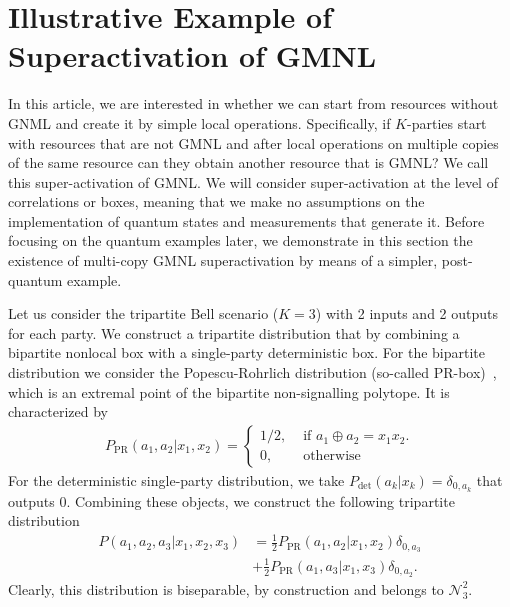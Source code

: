 \documentclass[pra,aps,reprint,superscriptaddress]{revtex4-2}
\theoremstyle{theorem}
\begin{document}
\section{Illustrative Example of Superactivation of GMNL}

In this article, we are interested in whether we can start from resources without GNML and create it by simple local operations. 
 Specifically, if $K$-parties start with resources that are not GMNL and after local operations on multiple copies of the same resource can they obtain another resource that is GMNL? We call this super-activation of GMNL. We will consider super-activation at the level of correlations or boxes, meaning that we make no assumptions on the implementation of quantum states and measurements that generate it. Before focusing on the quantum examples later, we demonstrate in this section  the existence of multi-copy GMNL superactivation by means of a simpler, post-quantum example.


Let us consider the tripartite Bell scenario ($K=3$) with 2 inputs and 2 outputs for each party. We construct a tripartite distribution that by combining a bipartite nonlocal box with a single-party deterministic box. For the bipartite distribution we consider the Popescu-Rohrlich distribution (so-called PR-box)~\cite{tsirelson, PRbox}, which is an extremal point of the bipartite non-signalling polytope. It is characterized by
\begin{align}\label{PR}
    P_{\textrm{PR}}(a_1,a_2|x_1,x_2) = \begin{cases}
1/2, & \text{ if } a_1\oplus a_2=x_1x_2.\\
0, & \text{ otherwise}
\end{cases}
\end{align}
For the deterministic single-party distribution, we take $P_{\mathrm{det}}(a_k|x_k)=\delta_{0,a_k}$ that outputs $0$. Combining these objects, we construct the following tripartite distribution
\begin{align}\nonumber
    P(a_1,a_2,a_3|x_1,x_2,x_3)& = \frac{1}{2}P_{\textrm{PR}}(a_1,a_2|x_1,x_2)\delta_{0,a_3} \\&+ \frac{1}{2}P_{\textrm{PR}}(a_1,a_3|x_1,x_3)\delta_{0,a_2}.\label{simple_ex}
\end{align}
Clearly, this distribution is biseparable, by construction and belongs to $\mathcal{N}^2_3$.
\end{document}
